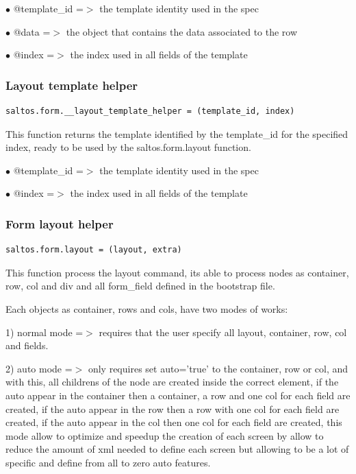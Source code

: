 \documentclass[a4paper]{article}
\begin{document}
\begin{compactitem}
\item[\color{myblue}$\bullet$] @template\_id =$>$ the template identity used in the spec
\item[\color{myblue}$\bullet$] @data        =$>$ the object that contains the data associated to the row
\item[\color{myblue}$\bullet$] @index       =$>$ the index used in all fields of the template
\end{compactitem}

\hypertarget{toc221}{}
\subsubsection{Layout template helper}

\begin{lstlisting}
saltos.form.__layout_template_helper = (template_id, index)
\end{lstlisting}

This function returns the template identified by the template\_id for the specified index, ready
to be used by the saltos.form.layout function.

\begin{compactitem}
\item[\color{myblue}$\bullet$] @template\_id =$>$ the template identity used in the spec
\item[\color{myblue}$\bullet$] @index       =$>$ the index used in all fields of the template
\end{compactitem}

\hypertarget{toc222}{}
\subsubsection{Form layout helper}

\begin{lstlisting}
saltos.form.layout = (layout, extra)
\end{lstlisting}

This function process the layout command, its able to process nodes as container, row, col and div
and all form\_field defined in the bootstrap file.

Each objects as container, rows and cols, have two modes of works:

1) normal mode =$>$ requires that the user specify all layout, container, row, col and fields.

2) auto mode =$>$ only requires set auto='true' to the container, row or col, and with this, all childrens
of the node are created inside the correct element, if the auto appear in the container then a container,
a row and one col for each field are created, if the auto appear in the row then a row with one col for
each field are created, if the auto appear in the col then one col for each field are created, this mode
allow to optimize and speedup the creation of each screen by allow to reduce the amount of xml needed
to define each screen but allowing to be a lot of specific and define from all to zero auto features.
\end{document}
